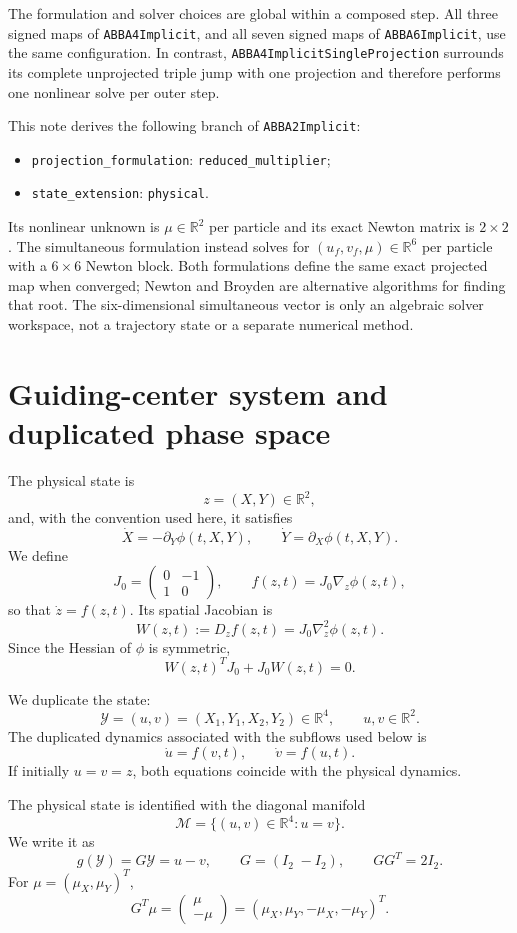 \documentclass[11pt,a4paper]{article}
\newcommand{\R}{\mathbb{R}}
\newcommand{\Id}{I}
\newcommand{\Y}{\mathcal{Y}}
\newcommand{\M}{\mathcal{M}}
\begin{document}
The formulation and solver choices are global within a composed step.  All
three signed maps of \texttt{ABBA4Implicit}, and all seven signed maps of
\texttt{ABBA6Implicit}, use the same configuration.  In contrast,
\texttt{ABBA4ImplicitSingleProjection} surrounds its complete unprojected
triple jump with one projection and therefore performs one nonlinear solve per
outer step.

This note derives the following branch of \texttt{ABBA2Implicit}:
\begin{itemize}
 \item \texttt{projection\_formulation}: \texttt{reduced\_multiplier};
 \item \texttt{state\_extension}: \texttt{physical}.
\end{itemize}
Its nonlinear unknown is $\mu\in\R^2$ per particle and its exact Newton matrix
is $2\times2$.  The simultaneous formulation instead solves for
$(u_f,v_f,\mu)\in\R^6$ per particle with a $6\times6$ Newton block.  Both
formulations define the same exact projected map when converged; Newton and
Broyden are alternative algorithms for finding that root.  The
six-dimensional simultaneous vector is only an algebraic solver workspace,
not a trajectory state or a separate numerical method.

\section{Guiding-center system and duplicated phase space}

The physical state is
\[
 z=(X,Y)\in\R^2,
\]
and, with the convention used here, it satisfies
\[
 \dot X=-\partial_Y\phi(t,X,Y),
 \qquad
 \dot Y=\partial_X\phi(t,X,Y).
\]
We define
\[
 J_0=
 \begin{pmatrix}
  0&-1\\
  1&0
 \end{pmatrix},
 \qquad
 f(z,t)=J_0\nabla_z\phi(z,t),
\]
so that $\dot z=f(z,t)$. Its spatial Jacobian is
\[
 W(z,t):=D_zf(z,t)=J_0\nabla_z^2\phi(z,t).
\]
Since the Hessian of $\phi$ is symmetric,
\[
 W(z,t)^TJ_0+J_0W(z,t)=0. \tag{1}
\]

We duplicate the state:
\[
 \Y=(u,v)=(X_1,Y_1,X_2,Y_2)\in\R^4,
 \qquad u,v\in\R^2.
\]
The duplicated dynamics associated with the subflows used below is
\[
 \dot u=f(v,t),
 \qquad
 \dot v=f(u,t).
\]
If initially $u=v=z$, both equations coincide with the physical dynamics.

The physical state is identified with the diagonal manifold
\[
 \M=\{(u,v)\in\R^4:u=v\}.
\]
We write it as
\[
 g(\Y)=G\Y=u-v,
 \qquad
 G=(\Id_2\; -\Id_2),
 \qquad
 GG^T=2\Id_2.
\]
For $\mu=(\mu_X,\mu_Y)^T$,
\[
 G^T\mu=
 \begin{pmatrix}\mu\\-\mu\end{pmatrix}
 =(\mu_X,\mu_Y,-\mu_X,-\mu_Y)^T.
\]
\end{document}
